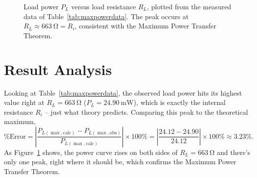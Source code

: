 \begin{figure}[h!]
    \centering
    \caption{Load power $P_L$ versus load resistance $R_L$, plotted from the measured data of Table~\ref{tab:maxpowerdata}. The peak occurs at $R_L \approx \qty{663}{\ohm} = R_i$, consistent with the Maximum Power Transfer Theorem.}
    \label{fig:maxpowergraph}
\end{figure}

\section{Result Analysis}
Looking at Table~\ref{tab:maxpowerdata}, the observed load power hits its highest value right at $R_L=\qty{663}{\ohm}$ ($P_{L}=\qty{24.90}{\milli\watt}$), which is exactly the internal resistance $R_i$ -- just what theory predicts. Comparing this peak to the theoretical maximum,
\[
\text{\% Error} = \left|\frac{P_{L(\max,\text{calc})}-P_{L(\max,\text{obs})}}{P_{L(\max,\text{calc})}}\right|\times100\% = \left|\frac{24.12-24.90}{24.12}\right|\times100\% \approx 3.23\%.
\]
As Figure~\ref{fig:maxpowergraph} shows, the power curve rises on both sides of $R_L=\qty{663}{\ohm}$ and there's only one peak, right where it should be, which confirms the Maximum Power Transfer Theorem.

